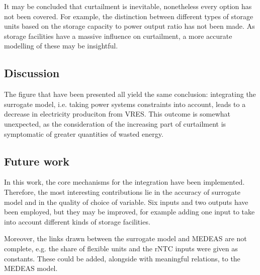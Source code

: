 It may be concluded that curtailment is inevitable, nonetheless every option has not been covered. For example, the distinction between different types of storage units based on the storage capacity to power output ratio has not been made. As storage facilities have a massive influence on curtailment, a more accurate modelling of these may be insightful.

\subsection{Discussion}

The figure that have been presented all yield the same conclusion: integrating the surrogate model, i.e. taking power systems constraints into account, leads to a decrease in electricity produciton from VRES. This outcome is somewhat unexpected, as the consideration of the increasing part of curtailment is symptomatic of greater quantities of wasted energy.

\subsection{Future work}

In this work, the core mechanisms for the integration have been implemented. Therefore, the most interesting contributions lie in the accuracy of surrogate model and in the quality of choice of variable. Six inputs and two outputs have been employed, but they may be improved, for example adding one input to take into account different kinds of storage facilities.

Moreover, the links drawn between the surrogate model and MEDEAS are not complete, e.g. the share of flexible units and the rNTC inputs were given as constants. These could be added, alongside with meaningful relations, to the MEDEAS model.


